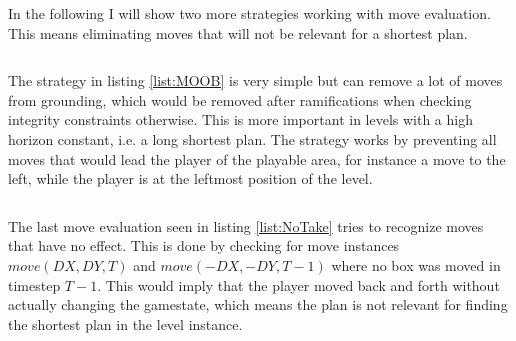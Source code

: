 \documentclass[12pt,a4paper,oneside]{report}
\begin{document}
In the following I will show two more strategies working with move evaluation. This means eliminating moves that will not be relevant for a shortest plan.


\begin{lstlisting}[caption={Moves out of Bounds},label=list:MOOB]
\end{lstlisting}

The strategy in listing \ref{list:MOOB} is very simple but can remove a lot of moves from grounding, which would be removed after ramifications when checking integrity constraints otherwise. This is more important in levels with a high horizon constant, i.e. a long shortest plan. The strategy works by preventing all moves that would lead the player of the playable area, for instance a move to the left, while the player is at the leftmost position of the level.


\begin{lstlisting}[caption={No Taking back Moves},label=list:NoTake]
\end{lstlisting}

The last move evaluation seen in listing \ref{list:NoTake} tries to recognize moves that have no effect. This is done by checking for move instances $move(DX,DY,T)$ and $move(-DX,-DY,T-1)$ where no box was moved in timestep $T-1$. This would imply that the player moved back and forth without actually changing the gamestate, which means the plan is not relevant for finding the shortest plan in the level instance.
\end{document}
